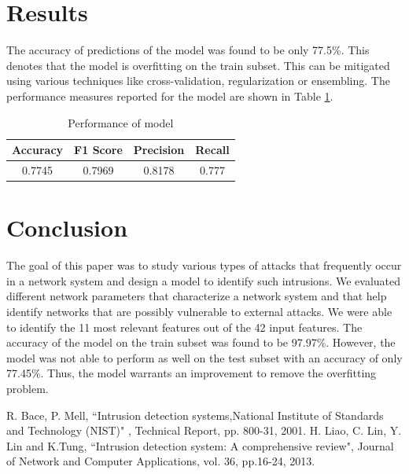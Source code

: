 \documentclass[conference]{IEEEtran}
\begin{document}
\section{Results}
The accuracy of predictions of the model was found to be only 77.5\%. This denotes that the model is overfitting on the train subset. This can be mitigated using various techniques like cross-validation, regularization or ensembling. The performance measures reported for the model are shown in Table \ref{tab3}.
\begin{table}[htbp]
\caption{Performance of model}
\begin{center}
\begin{tabular}{|c|c|c|c|}
\hline
Accuracy	&	F1 Score	&	Precision	&	Recall	\\
\hline
0.7745 &	 0.7969  &	 0.8178  &	0.777\\
\hline
\end{tabular}
\label{tab3}
\end{center}
\end{table}

\section{Conclusion}
The goal of this paper was to study various types of attacks that frequently occur in a network system and design a model to identify such intrusions. We evaluated different network parameters that characterize a network system and that help identify networks that are possibly vulnerable to external attacks. We were able to identify the 11 most relevant features out of the 42 input features. The accuracy of the model on the train subset was found to be 97.97\%. However, the model was not able to perform as well on the test subset with an accuracy of only 77.45\%. Thus, the model warrants an improvement to remove the overfitting problem.

\begin{thebibliography}{00}
 R. Bace, P. Mell, ``Intrusion detection systems,National Institute of Standards and
Technology (NIST)" , Technical Report, pp. 800-31, 2001.
 H. Liao, C. Lin, Y. Lin and K.Tung, ``Intrusion detection system: A comprehensive review", Journal of Network and Computer Applications, vol. 36, pp.16-24, 2013.
\end{thebibliography}
\end{document}

